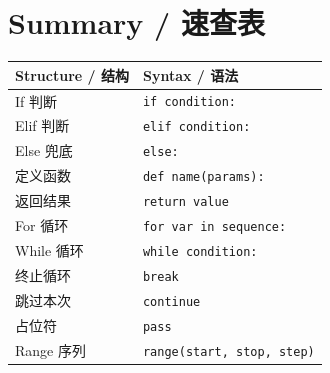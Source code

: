 \documentclass[11pt,a4paper]{article}
\begin{document}
\section{Summary / 速查表}

\begin{table}[h]
\centering
\small
\renewcommand{\arraystretch}{1.3}
\begin{tabular}{@{}ll@{}}
\toprule
\textbf{Structure / 结构} & \textbf{Syntax / 语法} \\ \midrule
If 判断 & \texttt{if condition:} \\
Elif 判断 & \texttt{elif condition:} \\
Else 兜底 & \texttt{else:} \\
定义函数 & \texttt{def name(params):} \\
返回结果 & \texttt{return value} \\
For 循环 & \texttt{for var in sequence:} \\
While 循环 & \texttt{while condition:} \\
终止循环 & \texttt{break} \\
跳过本次 & \texttt{continue} \\
占位符 & \texttt{pass} \\
Range 序列 & \texttt{range(start, stop, step)} \\ \bottomrule
\end{tabular}
\end{table}
\end{document}
